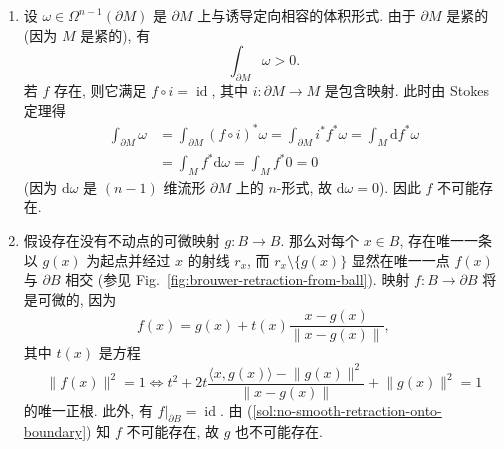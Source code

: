 \begin{description}[font=\normalfont,leftmargin=2em,labelwidth=1.5em]
\begin{enumerate}[label=(\alph*),ref=\alph*,leftmargin=*]
\item\label{sol:no-smooth-retraction-onto-boundary} 设 $\omega\in\Omega^{n-1}(\partial M)$ 是 $\partial M$ 上与诱导定向相容的体积形式. 由于 $\partial M$ 是紧的 (因为 $M$ 是紧的), 有
\[
  \int_{\partial M}\omega>0.
\]
若 $f$ 存在, 则它满足 $f\circ i=\operatorname{id}$, 其中 $i:\partial M\to M$ 是包含映射. 此时由 Stokes 定理得
\begin{align*}
  \int_{\partial M}\omega
  &=\int_{\partial M}(f\circ i)^*\omega=\int_{\partial M}i^* f^*\omega
  =\int_M\mathrm{d}f^*\omega\\
  &=\int_M f^*\mathrm{d}\omega=\int_M f^*0=0
\end{align*}
(因为 $\mathrm{d}\omega$ 是 $(n-1)$ 维流形 $\partial M$ 上的 $n$-形式, 故 $\mathrm{d}\omega=0$). 因此 $f$ 不可能存在.
\item 假设存在没有不动点的可微映射 $g:B\to B$. 那么对每个 $x\in B$, 存在唯一一条以 $g(x)$ 为起点并经过 $x$ 的射线 $r_x$, 而 $r_x\setminus\{g(x)\}$ 显然在唯一一点 $f(x)$ 与 $\partial B$ 相交 (参见 Fig.~\ref{fig:brouwer-retraction-from-ball}). 映射 $f:B\to\partial B$ 将是可微的, 因为
\[
  f(x)=g(x)+t(x)\frac{x-g(x)}{\lVert x-g(x)\rVert},
\]
其中 $t(x)$ 是方程
\[
  \lVert f(x)\rVert^2=1
  \iff t^2+2t\frac{\langle x,g(x)\rangle-\lVert g(x)\rVert^2}{\lVert x-g(x)\rVert}
           +\lVert g(x)\rVert^2=1
\]
的唯一正根. 此外, 有 $f|_{\partial B}=\operatorname{id}$. 由 (\ref{sol:no-smooth-retraction-onto-boundary}) 知 $f$ 不可能存在, 故 $g$ 也不可能存在.
\end{enumerate}
\end{description}

